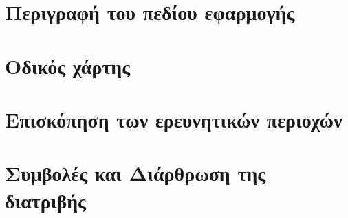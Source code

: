 \chapter{Περιγραφή του πεδίου εφαρμογής}


\chapter{Οδικός χάρτης}


\chapter{Επισκόπηση των ερευνητικών περιοχών}


\chapter{Συμβολές και Διάρθρωση της διατριβής}

